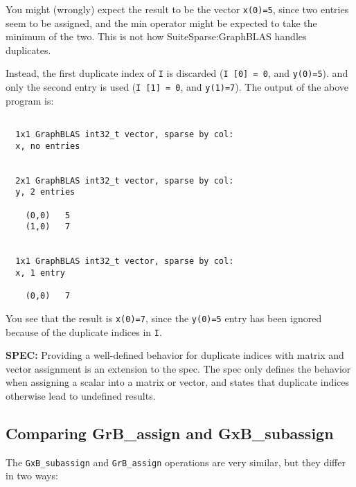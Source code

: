 \documentclass[12pt]{article}
\begin{document}
You might (wrongly) expect the result to be the vector \verb'x(0)=5', since
two entries seem to be assigned, and the min operator might be expected to
take the minimum of the two.  This is not how SuiteSparse:GraphBLAS handles
duplicates.

Instead, the first duplicate index of \verb'I' is discarded
(\verb'I [0] = 0', and \verb'y(0)=5').
and only the second entry is used
(\verb'I [1] = 0', and \verb'y(1)=7').
The output of the above program is:

{\small
\begin{verbatim}

  1x1 GraphBLAS int32_t vector, sparse by col:
  x, no entries


  2x1 GraphBLAS int32_t vector, sparse by col:
  y, 2 entries

    (0,0)   5
    (1,0)   7


  1x1 GraphBLAS int32_t vector, sparse by col:
  x, 1 entry

    (0,0)   7

\end{verbatim}}

You see that the result is \verb'x(0)=7', since the \verb'y(0)=5' entry
has been ignored because of the duplicate indices in \verb'I'.

\begin{spec}
{\bf SPEC:} Providing a well-defined behavior for duplicate
indices with matrix and vector assignment is an extension to the spec.
The spec only defines the behavior when assigning a scalar into a matrix
or vector, and states that duplicate indices otherwise lead to undefined
results.
\end{spec}



\newpage
\subsection{Comparing {\sf GrB\_assign} and {\sf GxB\_subassign}} %
\label{compare_assign}


The \verb'GxB_subassign' and \verb'GrB_assign' operations are very similar, but
they differ in two ways:
\end{document}
